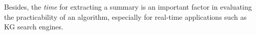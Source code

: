 Besides, the \emph{time} for extracting a summary is an important factor in evaluating the practicability of an algorithm, especially for real-time applications such as KG search engines.

